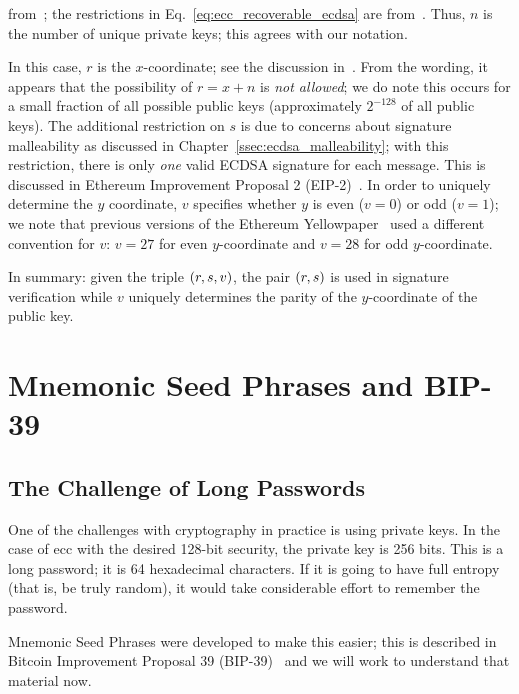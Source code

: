 \noindent
from~\cite[Eq.~313]{EthereumYellowpaper};
the restrictions in Eq.~\eqref{eq:ecc_recoverable_ecdsa}
are from~\cite[Eqs.~310--312]{EthereumYellowpaper}.
Thus, $n$ is the number of unique private keys;
this agrees with our notation.

In this case, $r$ is the $x$-coordinate;
see the discussion in~\cite[Appendix F]{EthereumYellowpaper}.
From the wording, it appears that the possibility
of $r = x + n$ is \emph{not allowed};
we do note this occurs for a small fraction of all possible
public keys (approximately $2^{-128}$ of all public keys).
The additional restriction on $s$ is due to concerns about signature
malleability as discussed in Chapter~\ref{ssec:ecdsa_malleability};
with this restriction, there is only \emph{one} valid ECDSA signature
for each message.
This is discussed in Ethereum Improvement Proposal 2 (EIP-2)~\cite{EIP-2}.
In order to uniquely determine the $y$ coordinate, $v$ specifies
whether $y$ is even ($v=0$) or odd ($v=1$);
we note that previous versions of the
Ethereum Yellowpaper~\cite[Appendix F]{EthereumYellowpaperOct2019}
used a different convention for $v$: $v=27$ for even $y$-coordinate
and $v=28$ for odd $y$-coordinate.

In summary: given the triple $\left( r,s,v \right)$,
the pair $\left( r,s \right)$ is used in signature verification
while $v$ uniquely determines the parity of the $y$-coordinate
of the public key.



\section{Mnemonic Seed Phrases and BIP-39}
\label{sec:ecc_bip39}

\subsection{The Challenge of Long Passwords}

One of the challenges with cryptography in practice is using private keys.
In the case of \gls{ecc} with the desired 128-bit security,
the private key is 256 bits.
This is a long password; it is 64 hexadecimal characters.
If it is going to have full entropy (that is, be truly random),
it would take considerable effort to remember the password.

Mnemonic Seed Phrases were developed to make this easier;
this is described in Bitcoin Improvement Proposal 39 (BIP-39)~\cite{BIP-39}
and we will work to understand that material now.

